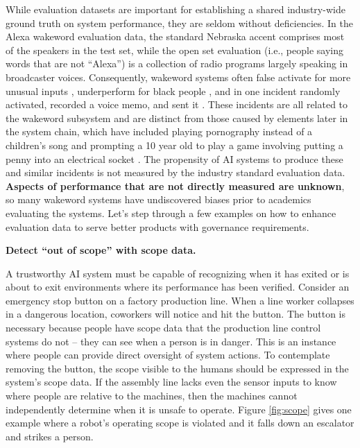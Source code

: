 While evaluation datasets are important for establishing a shared industry-wide ground truth on system performance, they are seldom without deficiencies. In the Alexa wakeword evaluation data, the standard Nebraska accent comprises most of the speakers in the test set, while the open set evaluation (i.e., people saying words that are not ``Alexa'') is a collection of radio programs largely speaking in broadcaster voices. Consequently, wakeword systems often false activate for more unusual inputs \cite{yampolskiy_incident_2015}, underperform for black people \cite{anonymous_incident_2020}, and in one incident randomly activated, recorded a voice memo, and sent it \cite{colmer_incident_2018}. These incidents are all related to the wakeword subsystem and are distinct from those caused by elements later in the system chain, which have included playing pornography instead of a children's song \cite{yampolskiy_incident_2016} and prompting a 10 year old to play a game involving putting a penny into an electrical socket \cite{anonymous_incident_2021}. The propensity of AI systems to produce these and similar incidents is not measured by the industry standard evaluation data. \textbf{Aspects of performance that are not directly measured are unknown}, so many wakeword systems have undiscovered biases prior to academics evaluating the systems. Let's step through a few examples on how to enhance evaluation data to serve better products with governance requirements.

\textbf{Detect ``out of scope'' with scope data.}

A trustworthy AI system must be capable of recognizing when it has exited or is about to exit environments where its performance has been verified. Consider an emergency stop button on a factory production line. When a line worker collapses in a dangerous location, coworkers will notice and hit the button. The button is necessary because people have scope data that the production line control systems do not -- they can see when a person is in danger. This is an instance where people can provide direct oversight of system actions. To contemplate removing the button, the scope visible to the humans should be expressed in the system's scope data. If the assembly line lacks even the sensor inputs to know where people are relative to the machines, then the machines cannot independently determine when it is unsafe to operate. Figure \ref{fig:scope} gives one example where a robot's operating scope is violated and it falls down an escalator and strikes a person.

